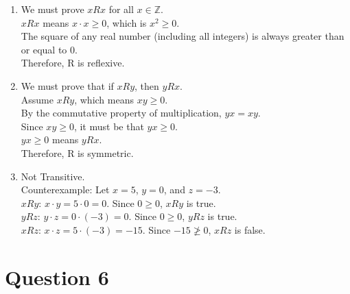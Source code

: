 \documentclass[twoside]{article}
\begin{document}
    \begin{enumerate}
        \item[(a.)]   We must prove $x R x$ for all $x \in \mathbb{Z}$. \\
                      $x R x$ means $x \cdot x \ge 0$, which is $x^2 \ge 0$. \\
                      The square of any real number (including all integers) is always greater than or equal to 0. \\
                      Therefore, R is reflexive.
        \item[(b.)]   We must prove that if $x R y$, then $y R x$. \\
                      Assume $x R y$, which means $xy \ge 0$. \\
                      By the commutative property of multiplication, $yx = xy$. \\
                      Since $xy \ge 0$, it must be that $yx \ge 0$. \\
                      $yx \ge 0$ means $y R x$. \\
                      Therefore, R is symmetric.

        \item[(c.)]   Not Transitive. \\
                      Counterexample: Let $x = 5$, $y = 0$, and $z = -3$. \\
                      $x R y$: $x \cdot y = 5 \cdot 0 = 0$. Since $0 \ge 0$, $x R y$ is true. \\
                      $y R z$: $y \cdot z = 0 \cdot (-3) = 0$. Since $0 \ge 0$, $y R z$ is true. \\
                      $x R z$: $x \cdot z = 5 \cdot (-3) = -15$. Since $-15 \not\ge 0$, $x R z$ is false.
    \end{enumerate}

\section*{Question 6}
\end{document}

